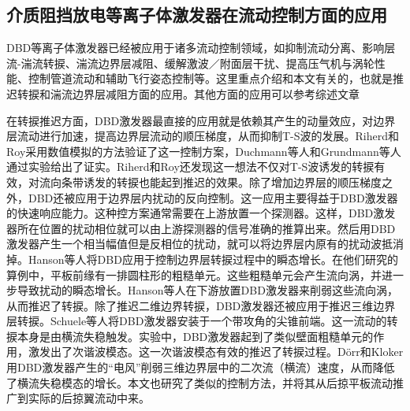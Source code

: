 \subsection{介质阻挡放电等离子体激发器在流动控制方面的应用}
DBD等离子体激发器已经被应用于诸多流动控制领域，如抑制流动分离\cite{Benard2016a,Sujar-Garrido2015,Benard2011,Benard2011a,Benard2016b,Little2010,Schneck2014,Jukes2009}、影响层流-湍流转捩\cite{Duchmann2014,Grundmann2007a,Grundmann2008,Kurz2014,Kotsonis2013,Hanson2010,Hanson2014}、湍流边界层减阻\cite{Jukes2006,Jukes2009,Mahfoze2017}、缓解激波／附面层干扰\cite{Im2012,Peschke2013}、提高压气机与涡轮性能\cite{huang2006,Ness2012}、控制管道流动\cite{Benard2008}和辅助飞行姿态控制\cite{He2009,Wei2013bang}等。这里重点介绍和本文有关的，也就是推迟转捩和湍流边界层减阻方面的应用。其他方面的应用可以参考综述文章\cite{Corke2010,wang2013Recent,wuyun2015}

在转捩推迟方面，DBD激发器最直接的应用就是依赖其产生的动量效应，对边界层流动进行加速，提高边界层流动的顺压梯度，从而抑制T-S波的发展。Riherd和Roy\cite{Riherd2013}采用数值模拟的方法验证了这一控制方案，Duchmann等人\cite{Duchmann2014,Grundmann2007a}和Grundmann等人\cite{Grundmann2007a}通过实验给出了证实。Riherd和Roy\cite{Riherd2014}还发现这一想法不仅对T-S波诱发的转捩有效，对流向条带诱发的转捩也能起到推迟的效果。除了增加边界层的顺压梯度之外，DBD还被应用于边界层内扰动的反向控制\cite{Grundmann2008,Kurz2014,Kotsonis2013,Simon2018}。这一应用主要得益于DBD激发器的快速响应能力。这种控方案通常需要在上游放置一个探测器。这样，DBD激发器所在位置的扰动相位就可以由上游探测器的信号准确的推算出来。然后用DBD激发器产生一个相当幅值但是反相位的扰动，就可以将边界层内原有的扰动波抵消掉。Hanson等人\cite{Hanson2010,Hanson2014}将DBD应用于控制边界层转捩过程中的瞬态增长。在他们研究的算例中，平板前缘有一排圆柱形的粗糙单元。这些粗糙单元会产生流向涡，并进一步导致扰动的瞬态增长。Hanson等人在下游放置DBD激发器来削弱这些流向涡，从而推迟了转捩。除了推迟二维边界转捩，DBD激发器还被应用于推迟三维边界层转捩。Schuele等人\cite{schuele2013control}将DBD激发器安装于一个带攻角的尖锥前端。这一流动的转捩本身是由横流失稳触发。实验中，DBD激发器起到了类似壁面粗糙单元的作用，激发出了次谐波模态。这一次谐波模态有效的推迟了转捩过程。D\"orr和Kloker\cite{dorr2016}用DBD激发器产生的“电风”削弱三维边界层中的二次流（横流）速度，从而降低了横流失稳模态的增长。本文也研究了类似的控制方法，并将其从后掠平板流动推广到实际的后掠翼流动中来。

